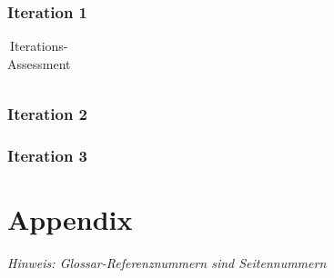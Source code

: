 \documentclass[11pt,ngerman]{article}
\begin{document}
    \subsubsection{Iteration 1}
    \begin{table}[H]
        \caption{Iterations-Assessment}
        \begin{tabularx}{\textwidth}{X}
            \toprule
            
            \bottomrule
        \end{tabularx}
        \label{tab:Iterations-Assessment: Iteration 1}
    \end{table}

    \subsubsection{Iteration 2}

    \subsubsection{Iteration 3}

     \newpage

    \section{Appendix}
    \textit{Hinweis: Glossar-Referenznummern sind Seitennummern}
    \printglossary
\end{document}
